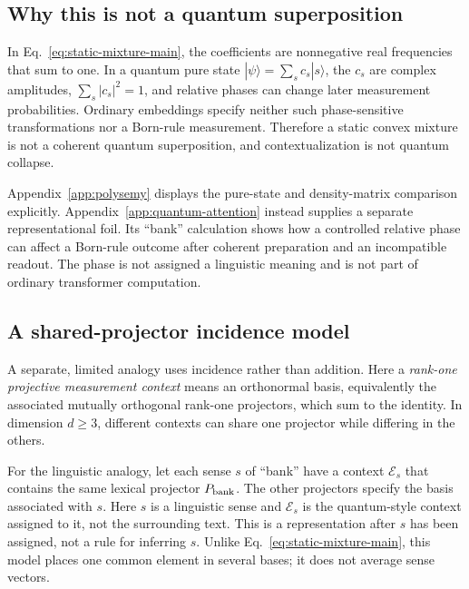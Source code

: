 \documentclass[
  aps,
  reprint,
  superscriptaddress,
  floatfix,
  nofootinbib,
  longbibliography
]{revtex4-2}
\begin{document}
\subsection{Why this is not a quantum superposition}

In Eq.~\eqref{eq:static-mixture-main}, the coefficients are nonnegative real
frequencies that sum to one.  In a quantum pure state
$|\psi\rangle=\sum_s c_s|s\rangle$, the $c_s$ are complex amplitudes,
$\sum_s|c_s|^2=1$, and relative phases can change later measurement
probabilities.  Ordinary embeddings specify neither such phase-sensitive
transformations nor a Born-rule measurement.  Therefore a static convex
mixture is not a coherent quantum superposition, and contextualization is not
quantum collapse.

Appendix~\ref{app:polysemy} displays the pure-state and density-matrix
comparison explicitly.  Appendix~\ref{app:quantum-attention} instead supplies
a separate representational foil.  Its ``bank'' calculation shows how a
controlled relative phase can affect a Born-rule outcome after coherent
preparation and an incompatible readout.  The phase is not assigned a
linguistic meaning and is not part of ordinary transformer computation.

\subsection{A shared-projector incidence model}

A separate, limited analogy uses incidence rather than addition.  Here a
\emph{rank-one projective measurement context} means an orthonormal basis,
equivalently the associated mutually orthogonal rank-one projectors, which sum
to the identity.  In
dimension $d\geq3$, different contexts can share one projector while differing
in the others.

For the linguistic analogy, let each sense $s$ of ``bank'' have a context
$\mathcal E_s$ that contains the same lexical projector $P_{\rm bank}$.  The
other projectors specify the basis associated with $s$.  Here $s$ is a
linguistic sense and $\mathcal E_s$ is the quantum-style context assigned to
it, not the surrounding text.  This is a representation after $s$ has been
assigned, not a rule for inferring $s$.  Unlike
Eq.~\eqref{eq:static-mixture-main}, this model places one common element in
several bases; it does not average sense vectors.
\end{document}
